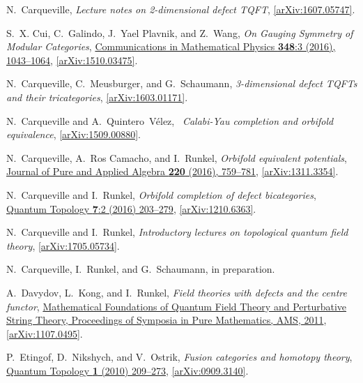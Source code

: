 \documentclass[12pt]{scrartcl}
\newcommand\arxiv[2]      {\href{http://arXiv.org/abs/#1}{#2}}
\newcommand\doi[2]        {\href{http://dx.doi.org/#1}{#2}}
\theoremstyle{definition}
\numberwithin{equation}{section}
\numberwithin{definition}{section}
\numberwithin{figure}{section}
\begin{document}
\begin{thebibliography}{BDSPV}
N.~Carqueville, 
\textsl{Lecture notes on 2-dimensional defect TQFT}, 
\href{http://arxiv.org/abs/1607.05747}{[arXiv:1607.05747]}.

S.~X. Cui, C.~Galindo, J.~Yael Plavnik, and Z.~Wang, 
\textsl{On Gauging Symmetry of Modular Categories}, 
\doi{10.1007/s00220-016-2633-8}{Communications in Mathematical Physics \textbf{348}:3 (2016), 1043--1064}, 
\href{http://arxiv.org/abs/1510.03475}{[arXiv:1510.03475]}.

N.~Carqueville, C.~Meusburger, and G.~Schaumann, 
\textsl{3-dimensional defect TQFTs and their tricategories}, 
\href{http://arxiv.org/abs/1603.01171}{[arXiv:1603.01171]}.

N.~Carqueville and A.~Quintero~V\'elez, \
\textsl{Calabi-Yau completion and orbifold equivalence}, 
\href{http://arxiv.org/abs/1509.00880}{[arXiv:1509.00880]}.

N.~Carqueville, A.~Ros Camacho, and I.~Runkel, 
\textsl{Orbifold equivalent potentials}, 
\doi{10.1016/j.jpaa.2015.07.015}{Journal of Pure and Applied Algebra \textbf{220} (2016), 759--781}, 
\arxiv{1311.3354}{[arXiv:1311.3354]}.

N.~Carqueville and I.~Runkel, 
\textsl{Orbifold completion of defect bicategories}, 
\doi{10.4171/QT/76}{Quantum Topology \textbf{7}:2 (2016) 203--279}, 
\href{http://arxiv.org/abs/1210.6363}{[arXiv:1210.6363]}.

N.~Carqueville and I.~Runkel, 
\textsl{Introductory lectures on topological quantum field theory}, 
\href{http://arxiv.org/abs/1705.05734}{[arXiv:1705.05734]}.

N.~Carqueville, I.~Runkel, and G.~Schaumann, 
in preparation.

A.~Davydov, L.~Kong, and I.~Runkel, 
\textsl{Field theories with defects and the centre functor}, 
\href{http://www.ams.org/bookstore?fn=20&arg1=pspumseries&ikey=PSPUM-83}{Mathematical Foundations of Quantum Field Theory and Perturbative String Theory, Proceedings of Symposia in Pure Mathematics, AMS, 2011}, \href{http://arxiv.org/abs/1107.0495}{[arXiv:1107.0495]}. 

P.~Etingof, D.~Nikshych, and V.~Ostrik, 
\textsl{Fusion categories and homotopy theory}, 
\doi{10.4171/QT/6}{Quantum Topology \textbf{1} (2010) 209--273},
\href{http://www.arxiv.org/abs/0909.3140}{[arXiv:0909.3140]}.


\end{thebibliography}
\end{document}
